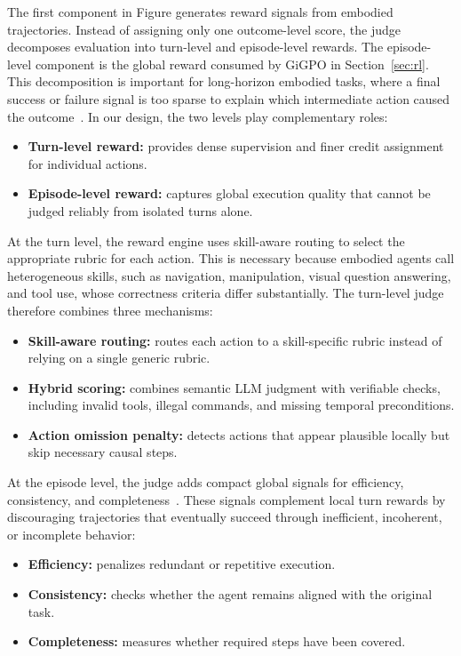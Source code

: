 The first component in Figure generates reward signals from embodied trajectories. Instead of assigning only one outcome-level score, the judge decomposes evaluation into turn-level and episode-level rewards. The episode-level component is the global reward consumed by GiGPO in Section~\ref{sec:rl}. This decomposition is important for long-horizon embodied tasks, where a final success or failure signal is too sparse to explain which intermediate action caused the outcome~\citep{wei2025reinforcing}. In our design, the two levels play complementary roles:
\begin{itemize}
    \item \textbf{Turn-level reward:} provides dense supervision and finer credit assignment for individual actions.
    \item \textbf{Episode-level reward:} captures global execution quality that cannot be judged reliably from isolated turns alone.
\end{itemize}

At the turn level, the reward engine uses skill-aware routing to select the appropriate rubric for each action. This is necessary because embodied agents call heterogeneous skills, such as navigation, manipulation, visual question answering, and tool use, whose correctness criteria differ substantially. The turn-level judge therefore combines three mechanisms:
\begin{itemize}
    \item \textbf{Skill-aware routing:} routes each action to a skill-specific rubric instead of relying on a single generic rubric.
    \item \textbf{Hybrid scoring:} combines semantic LLM judgment with verifiable checks, including invalid tools, illegal commands, and missing temporal preconditions.
    \item \textbf{Action omission penalty:} detects actions that appear plausible locally but skip necessary causal steps.
\end{itemize}

At the episode level, the judge adds compact global signals for efficiency, consistency, and completeness~\citep{han2026swetrace}. These signals complement local turn rewards by discouraging trajectories that eventually succeed through inefficient, incoherent, or incomplete behavior:
\begin{itemize}
    \item \textbf{Efficiency:} penalizes redundant or repetitive execution.
    \item \textbf{Consistency:} checks whether the agent remains aligned with the original task.
    \item \textbf{Completeness:} measures whether required steps have been covered.
\end{itemize}

